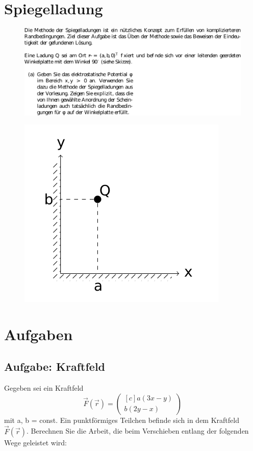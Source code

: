 \section{Spiegelladung}
\begin{figure}
 \centering
 \includegraphics{media/spiegelladung.pdf}
\end{figure}
\begin{figure}
    \centering
    \includegraphics{media/Skizze.png}
   \end{figure}
\pagebreak

\section{Aufgaben}
\subsection{Aufgabe: Kraftfeld}
Gegeben sei ein Kraftfeld
\begin{equation}
    \vec{F} (\vec{r}) = 
\begin{pmatrix*}[c]
a(3x − y) \\
b(2y − x)
\end{pmatrix*}
\end{equation}
mit a, b = const.
Ein punktförmiges Teilchen befinde sich in dem Kraftfeld $\vec{F} (\vec{r})$. Berechnen Sie die Arbeit, die
beim Verschieben entlang der folgenden Wege geleistet wird:
 

